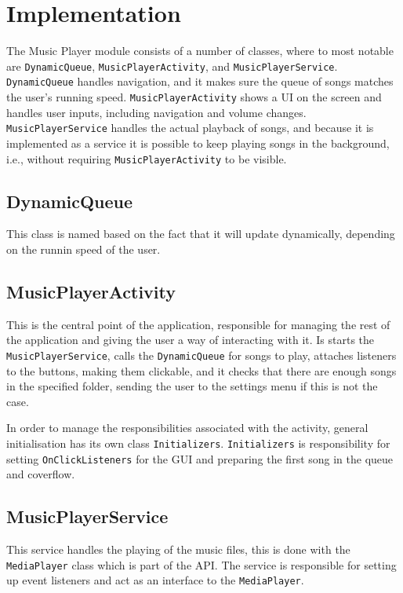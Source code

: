\section{Implementation}
The Music Player module consists of a number of classes, where to most notable are \texttt{DynamicQueue}, \texttt{MusicPlayerActivity}, and \texttt{MusicPlayerService}. \texttt{DynamicQueue} handles navigation, and it makes sure the queue of songs matches the user's running speed. \texttt{MusicPlayerActivity} shows a UI on the screen and handles user inputs, including navigation and volume changes. \texttt{MusicPlayerService} handles the actual playback of songs, and because it is implemented as a service it is possible to keep playing songs in the background, i.e., without requiring \texttt{MusicPlayerActivity} to be visible.

\subsection{DynamicQueue}
\label{sec:dynamicQueue}
This class is named based on the fact that it will update dynamically, depending on the runnin speed of the user.

\subsection{MusicPlayerActivity}
This is the central point of the application, responsible for managing the rest of the application and giving the user a way of interacting with it. Is starts the \texttt{MusicPlayerService}, calls the \texttt{DynamicQueue} for songs to play, attaches listeners to the buttons, making them clickable, and it checks that there are enough songs in the specified folder, sending the user to the settings menu if this is not the case.

In order to manage the responsibilities associated with the activity, general initialisation has its own class \texttt{Initializers}. \texttt{Initializers} is responsibility for setting \texttt{OnClickListeners} for the GUI and preparing the first song in the queue and coverflow. 

\subsection{MusicPlayerService} 
This service handles the playing of the music files, this is done with the \texttt{MediaPlayer} class which is part of the \citet{android:MediaPlayer} API. The service is responsible for setting up event listeners and act as an interface to the \texttt{MediaPlayer}.  

